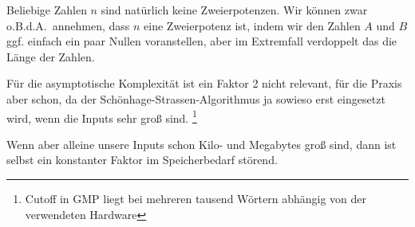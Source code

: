 \begin{remark}
    Beliebige Zahlen $n$ sind natürlich keine Zweierpotenzen. Wir können zwar o.B.d.A.\ annehmen, dass $n$ eine Zweierpotenz ist, indem wir den Zahlen $A$ und $B$ ggf. einfach ein paar Nullen voranstellen, aber im Extremfall verdoppelt das die Länge der Zahlen.

    Für die asymptotische Komplexität ist ein Faktor 2 nicht relevant, für die Praxis aber schon, da der Schönhage-Strassen-Algorithmus ja sowieso erst eingesetzt wird, wenn die Inputs sehr groß sind. \footnote{Cutoff in GMP liegt bei mehreren tausend Wörtern abhängig von der verwendeten Hardware}

    Wenn aber alleine unsere Inputs schon Kilo- und Megabytes groß sind, dann ist selbst ein konstanter Faktor im Speicherbedarf störend.
\end{remark}